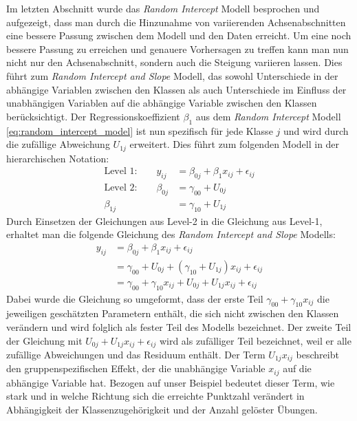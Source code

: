 \documentclass[12pt]{article}\usepackage[]{graphicx}\usepackage[]{color}
\begin{document}
Im letzten Abschnitt wurde das \textit{Random Intercept} Modell besprochen und aufgezeigt, dass man durch die Hinzunahme von variierenden Achsenabschnitten eine bessere Passung zwischen dem Modell und den Daten erreicht. Um eine noch bessere Passung zu erreichen und genauere Vorhersagen zu treffen kann man nun nicht nur den Achsenabschnitt, sondern auch die Steigung variieren lassen. Dies führt zum \textit{Random Intercept and Slope} Modell, das sowohl Unterschiede in der abhängige Variablen zwischen den Klassen als auch Unterschiede im Einfluss der unabhängigen Variablen auf die abhängige Variable zwischen den Klassen berücksichtigt. Der Regressionskoeffizient $\beta_{1}$ aus dem \textit{Random Intercept} Modell \eqref{eq:random_intercept_model} ist nun spezifisch für jede Klasse $j$ und wird durch die zufällige Abweichung $U_{1j}$ erweitert. Dies führt zum folgenden Modell in der hierarchischen Notation:
\begin{equation} \label{eq:random_intercept_slope_model}
\begin{split}	
 \text{Level 1:}  \qquad y_{ij} & = \beta_{0j} + \beta_{1}x_{ij} + \epsilon_{ij}\\
 \text{Level 2:} \qquad \beta_{0j} & = \gamma_{00} + U_{0j}\\
 \beta_{1j} & = \gamma_{10} + U_{1j}
\end{split}	
\end{equation} 
Durch Einsetzen der Gleichungen aus Level-2 in die Gleichung aus Level-1, erhaltet man die folgende Gleichung des \textit{Random Intercept and Slope} Modells:
\begin{equation} \label{eq:flat_random_intercept_slope_model}
\begin{split}	
y_{ij} & = \beta_{0j} + \beta_{1}x_{ij} + \epsilon_{ij}\\
& = \gamma_{00} + U_{0j} + (\gamma_{10} + U_{1j})x_{ij} + \epsilon_{ij}\\
& = \gamma_{00} + \gamma_{10}x_{ij} + U_{0j} + U_{1j}x_{ij} + \epsilon_{ij}
\end{split}	
\end{equation} 
Dabei wurde die Gleichung so umgeformt, dass der erste Teil $\gamma_{00} + \gamma_{10}x_{ij}$ die jeweiligen geschätzten Parametern enthält, die sich nicht zwischen den Klassen verändern und wird folglich als fester Teil des Modells bezeichnet. Der zweite Teil der Gleichung mit $U_{0j} + U_{1j}x_{ij} + \epsilon_{ij}$ wird als zufälliger Teil bezeichnet, weil er alle zufällige Abweichungen und das Residuum enthält. Der Term $U_{1j}x_{ij}$ beschreibt den gruppenspezifischen Effekt, der die unabhängige Variable $x_{ij}$ auf die abhängige Variable hat. Bezogen auf unser Beispiel bedeutet dieser Term, wie stark und in welche Richtung sich die erreichte Punktzahl verändert in Abhängigkeit der Klassenzugehörigkeit und der Anzahl gelöster Übungen. 
\end{document}
